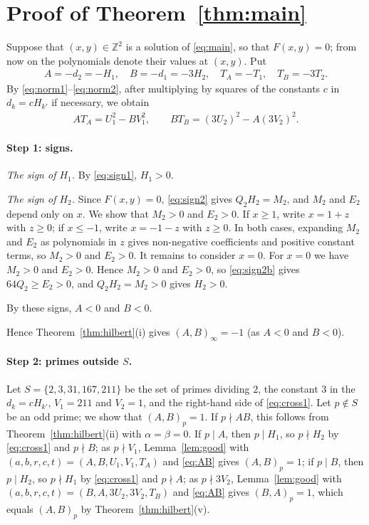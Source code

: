 \documentclass[11pt]{article}
\newcommand{\Z}{\mathbb{Z}}
\begin{document}
\section{Proof of Theorem~\ref{thm:main}}

Suppose that $(x,y)\in\Z^2$ is a solution of \eqref{eq:main}, so that $F(x,y)=0$; from now on the polynomials denote their values at $(x,y)$. Put
\begin{gather*}
A=-d_{2}=-H_{1},\quad B=-d_{1}=-3H_{2},\quad T_A=-T_{1},\quad T_B=-3T_{2}.
\end{gather*}
By \eqref{eq:norm1}--\eqref{eq:norm2}, after multiplying by squares of the constants $c$ in $d_k=cH_{k'}$ if necessary, we obtain
\begin{align}
AT_A=U_{1}^2-BV_{1}^2,\qquad BT_B=(3U_{2})^2-A(3V_{2})^2.\label{eq:AB}
\end{align}

\paragraph{Step 1: signs.} \emph{The sign of $H_{1}$.} By \eqref{eq:sign1}, $H_{1}>0$.

\emph{The sign of $H_{2}$.} Since $F(x,y)=0$, \eqref{eq:sign2} gives $Q_{2}H_{2}=M_{2}$, and $M_{2}$ and $E_{2}$ depend only on $x$. We show that $M_{2}>0$ and $E_{2}>0$. If $x\geq1$, write $x=1+z$ with $z\geq0$; if $x\leq-1$, write $x=-1-z$ with $z\geq0$. In both cases, expanding $M_{2}$ and $E_{2}$ as polynomials in $z$ gives non-negative coefficients and positive constant terms, so $M_{2}>0$ and $E_{2}>0$. It remains to consider $x=0$. For $x=0$ we have $M_{2}>0$ and $E_{2}>0$. Hence $M_{2}>0$ and $E_{2}>0$, so \eqref{eq:sign2b} gives $64Q_{2}\geq E_{2}>0$, and $Q_{2}H_{2}=M_{2}>0$ gives $H_{2}>0$.

By these signs, $A<0$ and $B<0$.

Hence Theorem~\ref{thm:hilbert}(i) gives $(A,B)_\infty=-1$ (as $A<0$ and $B<0$).

\paragraph{Step 2: primes outside $S$.} Let $S=\{2,3,31,167,211\}$ be the set of primes dividing $2$, the constant $3$ in the $d_k=cH_{k'}$, $V_{1}=211$ and $V_{2}=1$, and the right-hand side of \eqref{eq:cross1}. Let $p\notin S$ be an odd prime; we show that $(A,B)_p=1$. If $p\nmid AB$, this follows from Theorem~\ref{thm:hilbert}(ii) with $\alpha=\beta=0$. If $p\mid A$, then $p\mid H_{1}$, so $p\nmid H_{2}$ by \eqref{eq:cross1} and $p\nmid B$; as $p\nmid V_{1}$, Lemma~\ref{lem:good} with $(a,b,r,c,t)=(A,B,U_{1},V_{1},T_A)$ and \eqref{eq:AB} gives $(A,B)_p=1$; if $p\mid B$, then $p\mid H_{2}$, so $p\nmid H_{1}$ by \eqref{eq:cross1} and $p\nmid A$; as $p\nmid 3V_{2}$, Lemma~\ref{lem:good} with $(a,b,r,c,t)=(B,A,3U_{2},3V_{2},T_B)$ and \eqref{eq:AB} gives $(B,A)_p=1$, which equals $(A,B)_p$ by Theorem~\ref{thm:hilbert}(v).
\end{document}
